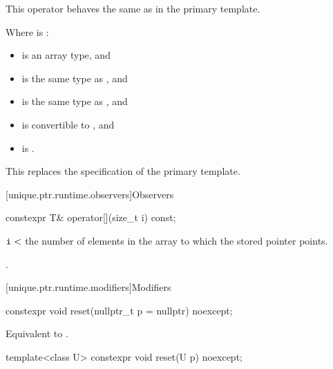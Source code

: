 \begin{itemdescr}
\pnum
This operator behaves the same as in the primary template.

\pnum
\constraints
Where  is :
\begin{itemize}
\item {} is an array type, and
\item {} is the same type as , and
\item {} is the same type as , and
\item {} is convertible to , and
\item {} is .
\end{itemize}

\begin{note}
This replaces the \constraints specification of the primary template.
\end{note}
\end{itemdescr}

[unique.ptr.runtime.observers]{Observers}

%
\begin{itemdecl}
constexpr T& operator[](size_t i) const;
\end{itemdecl}

\begin{itemdescr}
\pnum
\expects
$\tcode{i} <$ the
number of elements in the array to which
the stored pointer points.

\pnum
\returns
{}.
\end{itemdescr}

[unique.ptr.runtime.modifiers]{Modifiers}

%
\begin{itemdecl}
constexpr void reset(nullptr_t p = nullptr) noexcept;
\end{itemdecl}

\begin{itemdescr}
\pnum
\effects
Equivalent to .
\end{itemdescr}

%
\begin{itemdecl}
template<class U> constexpr void reset(U p) noexcept;
\end{itemdecl}

